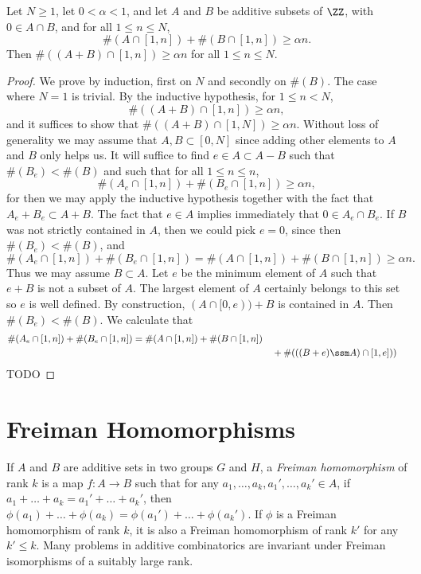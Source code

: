 \begin{theorem}
    Let $N \geq 1$, let $0 < \alpha < 1$, and let $A$ and $B$ be additive subsets of $\ZZ$, with $0 \in A \cap B$, and for all $1 \leq n \leq N$,
    \[ \#(A \cap [1,n]) + \#(B \cap [1,n]) \geq \alpha n. \]
    Then $\#((A + B) \cap [1,n]) \geq \alpha n$ for all $1 \leq n \leq N$.
\end{theorem}
\begin{proof}
    We prove by induction, first on $N$ and secondly on $\#(B)$. The case where $N = 1$ is trivial. By the inductive hypothesis, for $1 \leq n < N$,
    \[ \#((A + B) \cap [1,n]) \geq \alpha n, \]
    and it suffices to show that $\#((A + B) \cap [1,N]) \geq \alpha n$. Without loss of generality we may assume that $A,B \subset [0,N]$ since adding other elements to $A$ and $B$ only helps us. It will suffice to find $e \in A \subset A - B$ such that $\#(B_e) < \#(B)$ and such that for all $1 \leq n \leq n$,
    \[ \#(A_e \cap [1,n]) + \#(B_e \cap [1,n]) \geq \alpha n, \]
    for then we may apply the inductive hypothesis together with the fact that $A_e + B_e \subset A + B$. The fact that $e \in A$ implies immediately that $0 \in A_e \cap B_e$. If $B$ was not strictly contained in $A$, then we could pick $e = 0$, since then $\#(B_e) < \#(B)$, and
    \[ \#(A_e \cap [1,n]) + \#(B_e \cap [1,n]) = \#(A \cap [1,n]) + \#(B \cap [1,n]) \geq \alpha n. \]
    Thus we may assume $B \subset A$. Let $e$ be the minimum element of $A$ such that $e + B$ is not a subset of $A$. The largest element of $A$ certainly belongs to this set so $e$ is well defined. By construction, $(A \cap [0,e)) + B$ is contained in $A$. Then $\#(B_e) < \#(B)$. We calculate that
    \begin{align*}
        \#(A_e \cap [1,n]) + \#(B_e \cap [1,n]) = \#(A \cap [1,n]) + \#(B \cap [1,n])\\
        &\quad + \#(((B + e) \ssm A) \cap [1,e]))
    \end{align*}
    TODO
\end{proof}

\section{Freiman Homomorphisms}

If $A$ and $B$ are additive sets in two groups $G$ and $H$, a \emph{Freiman homomorphism} of rank $k$ is a map $f: A \to B$ such that for any $a_1,\dots,a_k,a_1',\dots,a_k' \in A$, if $a_1 + \dots + a_k = a_1' + \dots + a_k'$, then $\phi(a_1) + \dots + \phi(a_k) = \phi(a_1') + \dots + \phi(a_k')$. If $\phi$ is a Freiman homomorphism of rank $k$, it is also a Freiman homomorphism of rank $k'$ for any $k' \leq k$. Many problems in additive combinatorics are invariant under Freiman isomorphisms of a suitably large rank.

